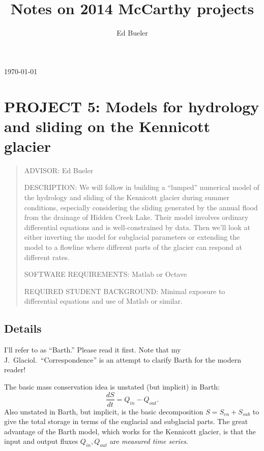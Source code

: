 \documentclass[11pt,final]{amsart}%
\title[]{Notes on 2014 McCarthy projects}
\author[]{Ed Bueler}
\begin{document}

\scriptsize \hfill \today \normalsize
\vspace{0.5in}

\maketitle
\thispagestyle{empty}

\setcounter{equation}{14}

\section*{PROJECT 5: Models for hydrology and sliding on the Kennicott glacier}

\begin{quote}
\noindent ADVISOR: Ed Bueler

\medskip
\noindent DESCRIPTION: We will follow \cite{Bartholomausetal2011} in building a ``lumped'' numerical model of the hydrology and sliding of the Kennicott glacier during summer conditions, especially considering the sliding generated by the annual flood from the drainage of Hidden Creek Lake.  Their model involves ordinary differential equations and is well-constrained by data.  Then we'll look at either inverting the model for subglacial parameters or extending the model to a flowline where different parts of the glacier can respond at different rates.

\medskip
\noindent SOFTWARE REQUIREMENTS: Matlab or Octave

\medskip
\noindent REQUIRED STUDENT BACKGROUND: Minimal exposure to differential equations and use of Matlab or similar.
\end{quote}

\subsection*{Details}  I'll refer to  \cite{Bartholomausetal2011} as ``Barth.''  Please read it first.  Note that my J.~Glaciol.~``Correspondence'' \citep{Bueler2014correspondence} is an attempt to clarify Barth for the modern reader!

The basic mass conservation idea is unstated (but implicit) in Barth:
\begin{equation}
\frac{dS}{dt} = Q_{in} - Q_{out}. \label{eq:massconserve}
\end{equation}
Also unstated in Barth, but implicit, is the basic decomposition $S = S_{en} + S_{sub}$ to give the total storage in terms of the englacial and subglacial parts.  The great advantage of the Barth model, which works for the Kennicott glacier, is that the input and output fluxes $Q_{in},Q_{out}$ are \emph{measured time series}.
\end{document}

